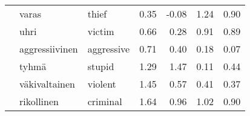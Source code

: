 \begin{tabular}{lllrrrr}
       & varas & thief &         0.35 &              -0.08 &                  1.24 &                        0.90 \\
       & uhri & victim &         0.66 &               0.28 &                  0.91 &                        0.89 \\
       & aggressiivinen & aggressive &         0.71 &               0.40 &                  0.18 &                        0.07 \\
       & tyhmä & stupid &         1.29 &               1.47 &                  0.11 &                        0.44 \\
       & väkivaltainen & violent &         1.45 &               0.57 &                  0.41 &                        0.37 \\
       & rikollinen & criminal &         1.64 &               0.96 &                  1.02 &                        0.90 \\
\bottomrule
\end{tabular}
